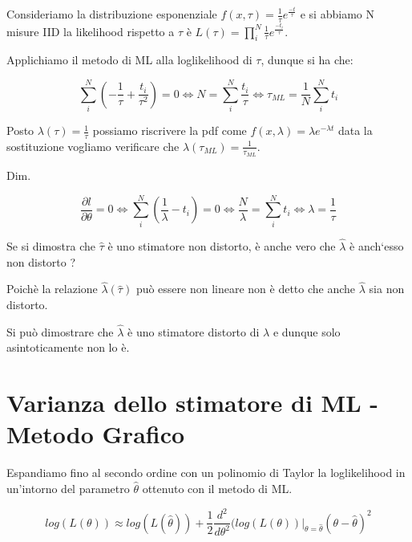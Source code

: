 Consideriamo la distribuzione esponenziale $f(x,\tau) = \frac{1}{\tau}e^{\frac{-t}{\tau}}$ e si abbiamo N misure IID la likelihood rispetto a $\tau$ \`{e} $L(\tau) = \prod_{i}^N \frac{1}{\tau}e^{\frac{-t_{i}}{\tau}}$.
\newline

\noindent Applichiamo il metodo di ML alla loglikelihood di $\tau$, dunque si ha che:

\begin{equation*}
		\sum_{i}^N(-\frac{1}{\tau}+ \frac{t_{i}}{\tau^2}) = 0 \iff N = \sum_{i}^N \frac{t_{i}}{\tau} \iff \tau_{ML} = \frac{1}{N} \sum_{i}^Nt_{i}
\end{equation*}

\noindent Posto $\lambda(\tau) = \frac{1}{\tau}$ possiamo riscrivere la pdf come $f(x,\lambda)= \lambda e^{-\lambda t}$ data la sostituzione vogliamo verificare che $\lambda(\tau_{ML}) = \frac{1}{\tau_{ML}}$.\newline


\noindent Dim.

\begin{equation*}
		\frac{\partial l}{\partial \theta} = 0 \iff \sum_{i}^N(\frac{1}{\lambda} - t_{i}) = 0 \iff \frac{N}{\lambda} = \sum_{i}^N t_{i} \iff \lambda = \frac{1}{\tau}
\end{equation*}

\noindent Se si dimostra che $\hat{\tau}$ \`{e} uno stimatore non distorto, \`{e} anche vero che $\hat{\lambda}$ \`{e} anch`esso non distorto ? \newline

Poich\`{e} la relazione $\hat{\lambda}(\hat{\tau})$ pu\`{o} essere non lineare non \`{e} detto che anche $\hat{\lambda}$ sia non distorto. 

\noindent Si pu\`{o} dimostrare che $\hat{\lambda}$ \`{e} uno stimatore distorto di $\lambda$ e dunque solo asintoticamente non lo \`{e}.

\section{Varianza dello stimatore di ML - Metodo Grafico}

Espandiamo fino al secondo ordine con un polinomio di Taylor la loglikelihood in un'intorno del parametro $\hat{\theta}$ ottenuto con il metodo di ML.

\begin{equation}
	log(L(\theta)) \approx log(L(\hat{\theta})) + \frac{1}{2}\frac{d^2}{d\theta^2}(log(L(\theta))\vert_{\theta = \hat{\theta}} (\theta - \hat{\theta})^2
\end{equation}

